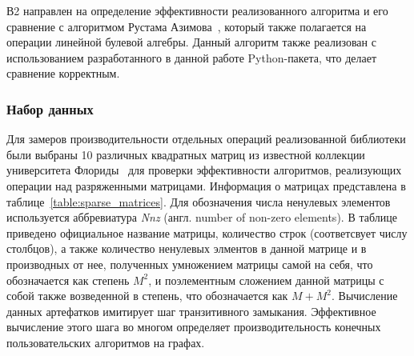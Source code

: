 В2 направлен на определение эффективности реализованного алгоритма и его сравнение с алгоритмом Рустама Азимова~\cite{inproceedings:cfqp_matrix_with_single_source}, который также полагается на операции линейной булевой алгебры. Данный алгоритм также реализован с использованием разработанного в данной работе Python-пакета, что делает сравнение корректным.

\subsubsection*{Набор данных}

Для замеров производительности отдельных операций реализованной библиотеки были выбраны 10 различных квадратных матриц из известной коллекции университета Флориды~\cite{net:sp_matrix_data_florida} для проверки эффективности алгоритмов, реализующих операции над разряженными матрицами. 
Информация о матрицах представлена в таблице~\ref{table:sparse_matrices}. 
Для обозначения числа ненулевых элементов используется аббревиатура \textit{Nnz} (англ. number of non-zero elements). 
В таблице приведено официальное название матрицы, количество строк (соответсвует числу столбцов), а также количество ненулевых элментов в данной матрице и в производных от нее, полученных умножением матрицы самой на себя, что обозначается как степень $M^2$, и поэлементным сложением данной матрицы с собой также возведенной в степень, что обозначается как $M + M^2$.
Вычисление данных артефатков имитирует шаг транзитивного замыкания.
Эффективное вычисление этого шага во многом определяет производительность конечных пользовательских алгоритмов на графах.

